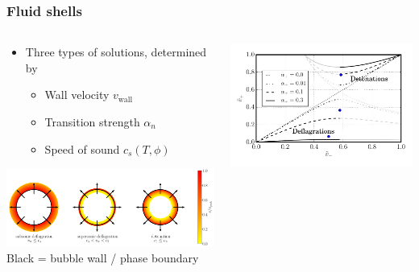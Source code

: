 \begin{frame}
    \frametitle{Fluid shells}
    \begin{columns}
    \begin{column}{0.6\textwidth}
        \begin{itemize}
            \item Three types of solutions, determined by
            \begin{itemize}
                \item Wall velocity $v_\text{wall}$
                \item Transition strength $\alpha_n$
                \item Speed of sound $c_s(T,\phi)$
            \end{itemize}
        \end{itemize}
        \includegraphics[width=\textwidth]{../fig/lecture_notes/all_circle} \\
        {\footnotesize Black = bubble wall / phase boundary}
    \end{column}
    \begin{column}{0.4\textwidth}
        \includegraphics[width=\textwidth]{../fig/lecture_notes/vplusvminus}
    \end{column}
    \end{columns}
\end{frame}

